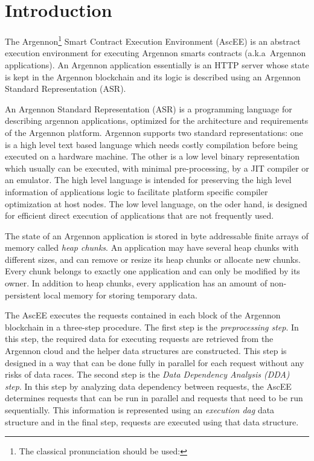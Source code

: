 

\section{Introduction}\label{sec:introduction}

The Argennon\footnote{The classical pronunciation should be used:} Smart Contract Execution
Environment (AscEE) is an abstract execution environment for executing Argennon smarts contracts (a.k.a\ Argennon
applications). An Argennon application essentially is an HTTP server whose state is kept in the Argennon blockchain and
its logic is described using an Argennon Standard Representation (ASR).

An Argennon Standard Representation (ASR) is a programming language for describing argennon applications, optimized
for the architecture and requirements of the Argennon platform.
Argennon supports two standard representations: one is a high level text based language which needs
costly compilation before being executed on a hardware machine. The other is a low level binary representation which
usually can be executed, with minimal pre-processing, by a JIT compiler or an emulator. The high level
language is intended for preserving the high level information of applications logic to facilitate
platform specific compiler optimization at host nodes. The low level language, on the oder hand, is designed for
efficient direct execution of applications that are not frequently used.

The state of an Argennon application is stored in byte addressable finite arrays of memory called
\emph{heap chunks}. An application may have several heap chunks with different sizes, and can remove or
resize its heap chunks or allocate new chunks. Every chunk belongs to exactly one application and can only be modified
by its owner. In addition to heap chunks, every application has an amount of non-persistent local memory for
storing temporary data.

The AscEE executes the requests contained in each block of the Argennon
blockchain in a three-step procedure. The first step is the \emph{preprocessing step}. In this step, the required
data for executing requests are retrieved from the Argennon cloud and the helper data structures are constructed.
This step is
designed in a way that can be done fully in parallel for each request without any risks of data races. The second
step is the \emph{Data Dependency Analysis (DDA) step}.
In this step by analyzing data dependency between requests, the AscEE determines requests that can be run in parallel
and requests that need to be run sequentially. This information is represented using an \emph{execution dag} data
structure and in the final step, requests are executed using that data structure.


